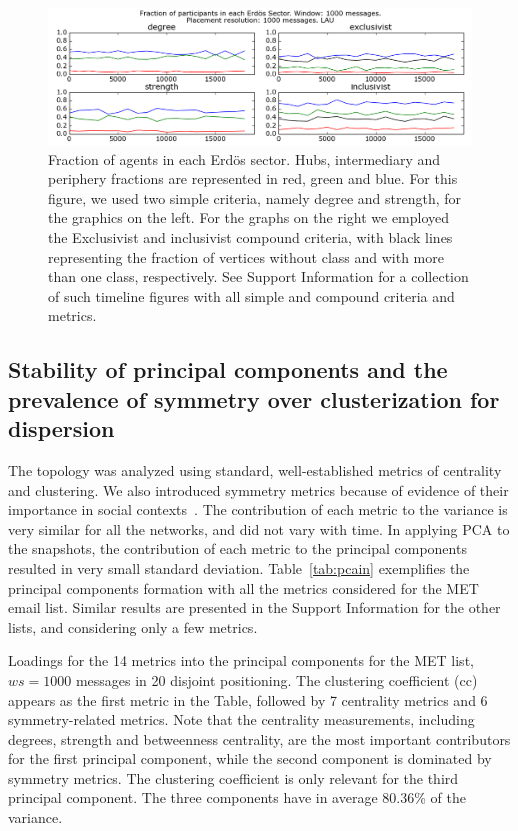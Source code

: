 \documentclass[%
 aip,
 jmp,%
 amsmath,amssymb,
 reprint,%
]{revtex4-1}
\begin{document}
\begin{figure} 
   \centering
        \includegraphics[width=\textwidth]{figs/InText-WLAU-S1000}
	\caption{Fraction of agents in each Erd\"os sector. Hubs, intermediary and periphery fractions are represented in red, green and blue. For this figure, we used two simple criteria, namely degree and strength, for the graphics on the left. For the graphs on the right we employed the Exclusivist and inclusivist compound criteria, with black lines representing the fraction of vertices without class and with more than one class, respectively. See Support Information for a collection of such timeline figures with all simple and compound criteria and metrics.}
    \label{fig:sectIL}
\end{figure}


\subsection{Stability of principal components and the prevalence of symmetry over clusterization for dispersion}\label{prevalence}
The topology was analyzed using standard, well-established metrics of centrality and clustering.
We also introduced symmetry metrics because of evidence of their importance in social contexts~\cite{newmanEvolving}.
The contribution of each metric to the variance is very similar for all the networks, and did not vary with time.
In applying PCA to the snapshots, the contribution of each metric to the principal components resulted in very small standard deviation. Table~\ref{tab:pcain} exemplifies the principal components formation with all the metrics considered for the MET email list. Similar results are presented in the Support Information for the other lists, and considering only a few metrics.

\begin{table}[!h]
	\caption{Loadings for the 14 metrics into the principal components for the MET list, $ws=1000$ messages in 20 disjoint positioning. The clustering coefficient (cc) appears as the first metric in the Table, followed by 7 centrality metrics and 6 symmetry-related metrics. Note that the centrality measurements, including degrees, strength and betweenness centrality, are the most important contributors for the first principal component, while the second component is dominated by symmetry metrics. The clustering coefficient is only relevant for the third principal component. The three components have in average 80.36\% of the variance.}
	\footnotesize
	
\label{tab:pcain}
\end{table}
\end{document}
